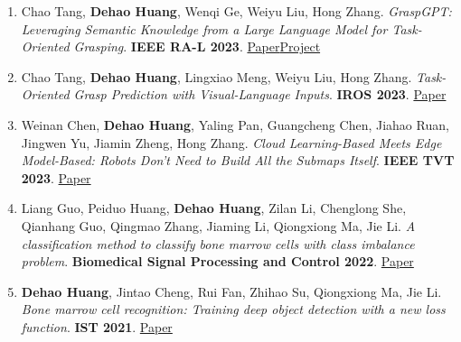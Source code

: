 \begin{enumerate}[label={\arabic*.},leftmargin=1.4em,itemsep=5pt,parsep=0pt,topsep=3pt]
\item \begin{minipage}[t]{\linewidth}Chao Tang, \textbf{Dehao Huang}, Wenqi Ge, Weiyu Liu, Hong Zhang. \emph{GraspGPT: Leveraging Semantic Knowledge from a Large Language Model for Task-Oriented Grasping}. \textbf{IEEE RA-L 2023}. {\small \href{https://arxiv.org/abs/2307.13204}{Paper}\enspace \href{https://sites.google.com/view/graspgpt/}{Project}}\end{minipage}
\item \begin{minipage}[t]{\linewidth}Chao Tang, \textbf{Dehao Huang}, Lingxiao Meng, Weiyu Liu, Hong Zhang. \emph{Task-Oriented Grasp Prediction with Visual-Language Inputs}. \textbf{IROS 2023}. {\small \href{https://arxiv.org/abs/2302.14355}{Paper}}\end{minipage}
\item \begin{minipage}[t]{\linewidth}Weinan Chen, \textbf{Dehao Huang}, Yaling Pan, Guangcheng Chen, Jiahao Ruan, Jingwen Yu, Jiamin Zheng, Hong Zhang. \emph{Cloud Learning-Based Meets Edge Model-Based: Robots Don't Need to Build All the Submaps Itself}. \textbf{IEEE TVT 2023}. {\small \href{https://ieeexplore.ieee.org/abstract/document/10264105}{Paper}}\end{minipage}
\item \begin{minipage}[t]{\linewidth}Liang Guo, Peiduo Huang, \textbf{Dehao Huang}, Zilan Li, Chenglong She, Qianhang Guo, Qingmao Zhang, Jiaming Li, Qiongxiong Ma, Jie Li. \emph{A classification method to classify bone marrow cells with class imbalance problem}. \textbf{Biomedical Signal Processing and Control 2022}. {\small \href{https://www.sciencedirect.com/science/article/abs/pii/S1746809421008934}{Paper}}\end{minipage}
\item \begin{minipage}[t]{\linewidth}\textbf{Dehao Huang}, Jintao Cheng, Rui Fan, Zhihao Su, Qiongxiong Ma, Jie Li. \emph{Bone marrow cell recognition: Training deep object detection with a new loss function}. \textbf{IST 2021}. {\small \href{https://arxiv.org/abs/2110.12647}{Paper}}\end{minipage}
\end{enumerate}
